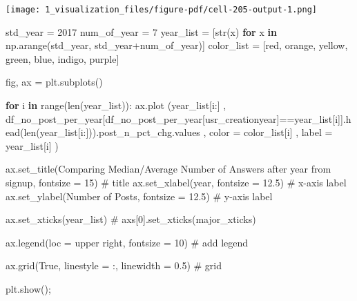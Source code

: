 \documentclass[
  letterpaper,
  DIV=11,
  numbers=noendperiod]{scrartcl}
\newenvironment{Shaded}{\begin{snugshade}}{\end{snugshade}}
\newcommand{\BuiltInTok}[1]{\textcolor[rgb]{0.00,0.23,0.31}{#1}}
\newcommand{\CommentTok}[1]{\textcolor[rgb]{0.37,0.37,0.37}{#1}}
\newcommand{\ControlFlowTok}[1]{\textcolor[rgb]{0.00,0.23,0.31}{\textbf{#1}}}
\newcommand{\DecValTok}[1]{\textcolor[rgb]{0.68,0.00,0.00}{#1}}
\newcommand{\FloatTok}[1]{\textcolor[rgb]{0.68,0.00,0.00}{#1}}
\newcommand{\KeywordTok}[1]{\textcolor[rgb]{0.00,0.23,0.31}{\textbf{#1}}}
\newcommand{\NormalTok}[1]{\textcolor[rgb]{0.00,0.23,0.31}{#1}}
\newcommand{\OperatorTok}[1]{\textcolor[rgb]{0.37,0.37,0.37}{#1}}
\newcommand{\StringTok}[1]{\textcolor[rgb]{0.13,0.47,0.30}{#1}}
\newcommand{\VariableTok}[1]{\textcolor[rgb]{0.07,0.07,0.07}{#1}}
\begin{document}
\texttt{[image: 1\_visualization\_files/figure-pdf/cell-205-output-1.png]}

\begin{Shaded}
\begin{Highlighting}[]
\NormalTok{std\_year }\OperatorTok{=} \DecValTok{2017}
\NormalTok{num\_of\_year }\OperatorTok{=} \DecValTok{7}
\NormalTok{year\_list }\OperatorTok{=}\NormalTok{ [}\BuiltInTok{str}\NormalTok{(x) }\ControlFlowTok{for}\NormalTok{ x }\KeywordTok{in}\NormalTok{ np.arange(std\_year, std\_year}\OperatorTok{+}\NormalTok{num\_of\_year)]}
\NormalTok{color\_list }\OperatorTok{=}\NormalTok{ [}\StringTok{\textquotesingle{}red\textquotesingle{}}\NormalTok{, }\StringTok{\textquotesingle{}orange\textquotesingle{}}\NormalTok{, }\StringTok{\textquotesingle{}yellow\textquotesingle{}}\NormalTok{, }\StringTok{\textquotesingle{}green\textquotesingle{}}\NormalTok{, }\StringTok{\textquotesingle{}blue\textquotesingle{}}\NormalTok{, }\StringTok{\textquotesingle{}indigo\textquotesingle{}}\NormalTok{, }\StringTok{\textquotesingle{}purple\textquotesingle{}}\NormalTok{]}

\NormalTok{fig, ax }\OperatorTok{=}\NormalTok{ plt.subplots()}

\ControlFlowTok{for}\NormalTok{ i }\KeywordTok{in} \BuiltInTok{range}\NormalTok{(}\BuiltInTok{len}\NormalTok{(year\_list)):   }
\NormalTok{        ax.plot (year\_list[i:]}
\NormalTok{        , df\_no\_post\_per\_year[df\_no\_post\_per\_year[}\StringTok{\textquotesingle{}usr\_creationyear\textquotesingle{}}\NormalTok{]}\OperatorTok{==}\NormalTok{year\_list[i]].head(}\BuiltInTok{len}\NormalTok{(year\_list[i:])).post\_n\_pct\_chg.values}
\NormalTok{        ,  color }\OperatorTok{=}\NormalTok{ color\_list[i]}
\NormalTok{        ,  label }\OperatorTok{=}\NormalTok{ year\_list[i]}
\NormalTok{        ) }


\NormalTok{ax.set\_title(}\StringTok{\textquotesingle{}Comparing Median/Average Number of Answers after year from signup\textquotesingle{}}\NormalTok{, fontsize }\OperatorTok{=} \DecValTok{15}\NormalTok{) }\CommentTok{\# title}
\NormalTok{ax.set\_xlabel(}\StringTok{\textquotesingle{}year\textquotesingle{}}\NormalTok{, fontsize }\OperatorTok{=} \FloatTok{12.5}\NormalTok{) }\CommentTok{\# x{-}axis label}
\NormalTok{ax.set\_ylabel(}\StringTok{\textquotesingle{}Number of Posts\textquotesingle{}}\NormalTok{, fontsize }\OperatorTok{=} \FloatTok{12.5}\NormalTok{) }\CommentTok{\# y{-}axis label}

\NormalTok{ax.set\_xticks(year\_list)}
\CommentTok{\# axs[0].set\_xticks(major\_xticks)}

\NormalTok{ax.legend(loc }\OperatorTok{=} \StringTok{\textquotesingle{}upper right\textquotesingle{}}\NormalTok{, fontsize }\OperatorTok{=} \DecValTok{10}\NormalTok{) }\CommentTok{\# add legend}

\NormalTok{ax.grid(}\VariableTok{True}\NormalTok{, linestyle }\OperatorTok{=} \StringTok{\textquotesingle{}:\textquotesingle{}}\NormalTok{, linewidth }\OperatorTok{=} \FloatTok{0.5}\NormalTok{) }\CommentTok{\# grid}

\NormalTok{plt.show()}\OperatorTok{;}
\end{Highlighting}
\end{Shaded}
\end{document}
